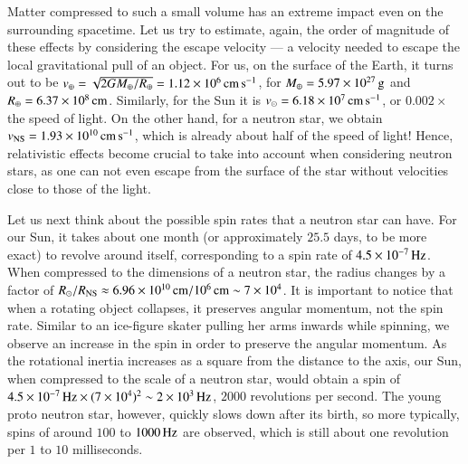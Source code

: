 Matter compressed to such a small volume has an extreme impact even on the surrounding spacetime. %
Let us try to estimate, again, the order of magnitude of these effects by considering the escape velocity --- a velocity needed to escape the local gravitational pull of an object.
For us, on the surface of the Earth, it turns out to be $v_{\mathrm{\oplus}} = \sqrt{2G M_{\oplus} / R_{\oplus}} = 1.12 \times 10^{6} \, \mathrm{cm}\,\mathrm{s}^{-1}$, for $M_{\oplus} = 5.97 \times 10^{27} \, \mathrm{g}$ and $R_{\oplus} = 6.37 \times 10^{8} \, \mathrm{cm}$.
Similarly, for the Sun it is $v_{\odot} = 6.18 \times 10^{7} \, \mathrm{cm}\,\mathrm{s}^{-1}$, or $0.002 \times$ the speed of light.
On the other hand, for a neutron star, we obtain $v_{\mathrm{NS}} = 1.93 \times 10^{10} \, \mathrm{cm}\,\mathrm{s}^{-1}$, which is already about half of the speed of light!
Hence, relativistic effects become crucial to take into account when considering neutron stars, as one can not even escape from the surface of the star without velocities close to those of the light.


Let us next think about the possible spin rates that a neutron star can have. %
For our Sun, it takes about one month (or approximately $25.5$ days, to be more exact) to revolve around itself, corresponding to a spin rate of $4.5 \times 10^{-7}\, \mathrm{Hz}$.
When compressed to the dimensions of a neutron star, the radius changes by a factor of $R_{\odot} / R_{\mathrm{NS}} \approx 6.96 \times 10^{10}\, \mathrm{cm} / 10^6 \, \mathrm{cm} \sim 7 \times 10^{4}$.
It is important to notice that when a rotating object collapses, it preserves  angular momentum, not the spin rate.
Similar to an ice-figure skater pulling her arms inwards while spinning, we observe an increase in the spin in order to preserve the angular momentum.
As the rotational inertia increases as a square from the distance to the axis, our Sun, when compressed to the scale of a neutron star, would obtain a spin of $4.5 \times 10^{-7}\, \mathrm{Hz} \times (7 \times 10^{4})^2 \sim 2 \times 10^{3} \, \mathrm{Hz}$, $2000$ revolutions per second.
The young proto neutron star, however, quickly slows down after its birth, so more typically, spins of around $100$ to $1000 \, \mathrm{Hz}$ are observed, which is still about one revolution per $1$ to $10$ milliseconds.


